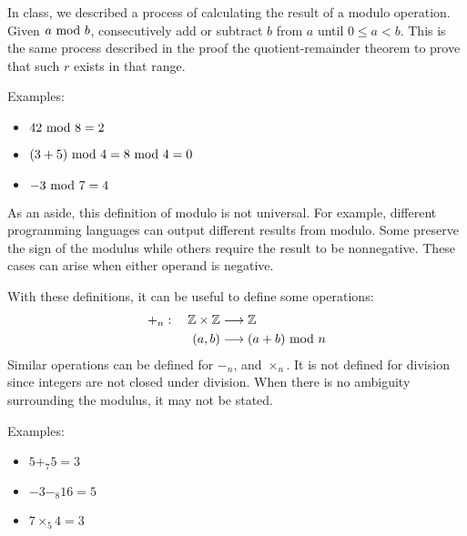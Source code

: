 In class, we described a process of calculating the result of a modulo operation. Given \(a\text{ mod } b\), consecutively add or subtract \(b\) from \(a\) until \(0\le a<b\).
This is the same process described in the proof the quotient-remainder theorem to prove that such \(r\) exists in that range.

\newpage %
Examples:
\begin{itemize}
    \item \(42 \text{ mod } 8=2\)
    \item \((3+5)\text{ mod } 4=8\text{ mod } 4=0\)
    \item \(-3\text{ mod } 7=4\)
\end{itemize}

As an aside, this definition of modulo is not universal. For example, different programming languages can output different results from modulo. Some preserve the sign of the modulus 
while others require the result to be nonnegative. These cases can arise when either operand is negative. 

With these definitions, it can be useful to define some operations:
\[\begin{aligned}
    +_n:\quad\mathbb{Z}\times\mathbb{Z}&\longrightarrow\mathbb{Z}\\
                                 (a,b) &\longrightarrow (a+b)\text{ mod } n
\end{aligned}\]
Similar operations can be defined for \(-_n\), and \(\times_n\). It is not defined for division since integers are not closed under division. When there is no ambiguity surrounding the modulus, 
it may not be stated.

Examples:
\begin{itemize}
    \item \(5+_7 5=3\)
    \item \(-3-_8 16=5\)
    \item \(7\times_5 4=3\)
\end{itemize}

